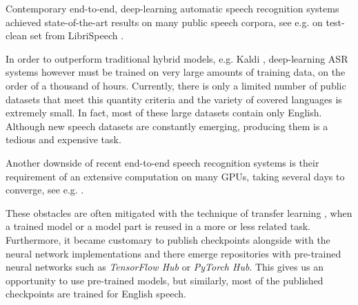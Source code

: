 
Contemporary end-to-end, deep-learning automatic speech recognition systems achieved state-of-the-art results on many public speech corpora, see e.g. 
on test-clean set from LibriSpeech .

In order to outperform traditional hybrid models, e.g. Kaldi , deep-learning ASR systems however must be trained on very large amounts of training data, on the order of a thousand of hours. Currently, there is only a limited number of public datasets that meet this quantity criteria and the variety of covered languages is extremely small. In fact, most of these large datasets contain only English. Although new speech datasets are constantly emerging, producing them is a tedious and expensive task.

Another downside of recent end-to-end speech recognition systems is their requirement of an extensive computation on many GPUs, taking several days to converge, see e.g. . 

These obstacles 
are often mitigated with the technique of transfer learning , when a trained model or a model part is reused in a more or less related task.
Furthermore, it became customary to publish checkpoints alongside with the neural network implementations and 
there emerge repositories with pre-trained neural networks such as \textit{TensorFlow Hub} or \textit{PyTorch
Hub}. This gives us an opportunity to use pre-trained models, but similarly, most of the published checkpoints are trained for English speech.


